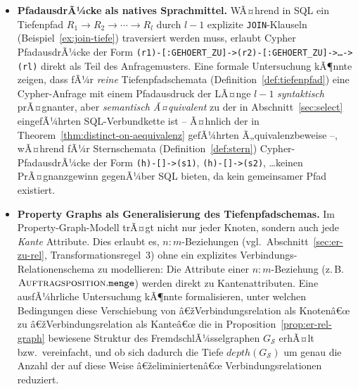 ﻿\documentclass[a4paper,12pt]{report}
\theoremstyle{definition}
\theoremstyle{remark}
\newcommand{\depth}{\mathit{depth}}
\begin{document}
\begin{itemize}
  \item \textbf{PfadausdrÃ¼cke als natives Sprachmittel.} WÃ¤hrend in
    SQL ein Tiefenpfad $R_1\to R_2\to\cdots\to R_l$ durch $l-1$
    explizite \texttt{JOIN}-Klauseln (Beispiel~\ref{ex:join-tiefe})
    traversiert werden muss, erlaubt Cypher PfadausdrÃ¼cke der Form
    \texttt{(r1)-[:GEHOERT\_ZU]->(r2)-[:GEHOERT\_ZU]->\ldots->(rl)}
    direkt als Teil des Anfragemusters. Eine formale Untersuchung
    kÃ¶nnte zeigen, dass fÃ¼r \emph{reine} Tiefenpfadschemata
    (Definition~\ref{def:tiefenpfad}) eine Cypher-Anfrage mit einem
    Pfadausdruck der LÃ¤nge $l-1$ \emph{syntaktisch} prÃ¤gnanter, aber
    \emph{semantisch Ã¤quivalent} zu der in
    Abschnitt~\ref{sec:select} eingefÃ¼hrten SQL-Verbundkette ist --
    Ã¤hnlich der in Theorem~\ref{thm:distinct-on-aequivalenz}
    gefÃ¼hrten Ã„quivalenzbeweise --, wÃ¤hrend fÃ¼r Sternschemata
    (Definition~\ref{def:stern}) Cypher-PfadausdrÃ¼cke der Form
    \texttt{(h)-[]->(s1)}, \texttt{(h)-[]->(s2)}, \ldots keinen
    PrÃ¤gnanzgewinn gegenÃ¼ber SQL bieten, da kein gemeinsamer Pfad
    existiert.

  \item \textbf{Property Graphs als Generalisierung des
    Tiefenpfadschemas.} Im Property-Graph-Modell trÃ¤gt nicht nur
    jeder Knoten, sondern auch jede \emph{Kante} Attribute. Dies
    erlaubt es, $n{:}m$-Beziehungen (vgl.\
    Abschnitt~\ref{sec:er-zu-rel}, Transformationsregel~3) ohne ein
    explizites Verbindungs-Relationenschema zu modellieren: Die
    Attribute einer $n{:}m$-Beziehung (z.\,B.\
    $\textsc{Auftragsposition}.\texttt{menge}$) werden direkt zu
    Kantenattributen. Eine ausfÃ¼hrliche Untersuchung kÃ¶nnte
    formalisieren, unter welchen Bedingungen diese Verschiebung von
    â€žVerbindungsrelation als Knotenâ€œ zu â€žVerbindungsrelation als
    Kanteâ€œ die in Proposition~\ref{prop:er-rel-graph} bewiesene
    Struktur des FremdschlÃ¼sselgraphen $G_{\mathcal{S}}$ erhÃ¤lt bzw.\
    vereinfacht, und ob sich dadurch die Tiefe
    $\depth(G_{\mathcal{S}})$ um genau die Anzahl der auf diese Weise
    â€želiminiertenâ€œ Verbindungsrelationen reduziert.


\end{itemize}
\end{document}
